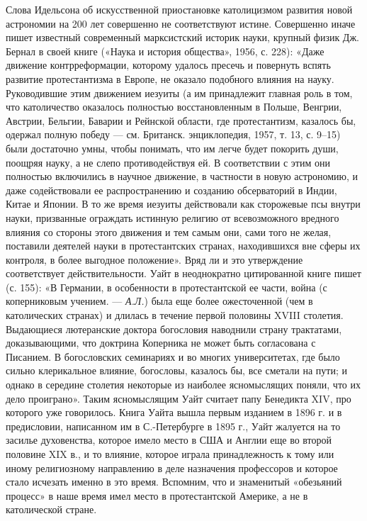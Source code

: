 Слова  Идельсона об  искусственной приостановке  католицизмом развития
новой  астрономии  на  200  лет совершенно  не  соответствуют  истине.
Совершенно  иначе  пишет  известный современный  марксистский  историк
науки,  крупный физик  Дж.  Бернал  в своей  книге  («Наука и  история
общества»,  1956, с.  228): «Даже  движение контрреформации,  которому
удалось пресечь  и повернуть вспять развитие  протестантизма в Европе,
не  оказало подобного  влияния на  науку. Руководившие  этим движением
иезуиты  (а  им  принадлежит  главная роль  в  том,  что  католичество
оказалось  полностью  восстановленным   в  Польше,  Венгрии,  Австрии,
Бельгии, Баварии  и Рейнской области, где  протестантизм, казалось бы,
одержал полную победу --- см.  Британск. энциклопедия, 1957, т. 13, с.
9--15)  были  достаточно умны,  чтобы  понимать,  что им  легче  будет
покорить  души,  поощряя  науку,  а не  слепо  противодействуя  ей.  В
соответствии с  этим они  полностью включились  в научное  движение, в
частности в новую астрономию,  и даже содействовали ее распространению
и  созданию обсерваторий  в  Индии,  Китае и  Японии.  В  то же  время
иезуиты  действовали  как  сторожевые  псы  внутри  науки,  призванные
ограждать  истинную  религию  от  всевозможного  вредного  влияния  со
стороны этого движения и тем самым  они, сами того не желая, поставили
деятелей  науки в  протестантских странах,  находившихся вне  сферы их
контроля,  в более  выгодное  положение». Вряд  ли  и это  утверждение
соответствует действительности. Уайт в неоднократно цитированной книге
пишет (с. 155): «В Германии,  в особенности в протестантской ее части,
война  (с  коперниковым  учением.  ---  \emph{А.Л.})  была  еще  более
ожесточенной (чем в  католических странах) и длилась  в течение первой
половины  XVIII столетия.  Выдающиеся  лютеранские доктора  богословия
наводнили  страну трактатами,  доказывающими,  что доктрина  Коперника
не  может  быть  согласована  с Писанием.  В  богословских  семинариях
и  во  многих университетах,  где  было  сильно клерикальное  влияние,
богословы,  казалось бы,  все сметали  на  пути; и  однако в  середине
столетия  некоторые  из  наиболее  ясномыслящих поняли,  что  их  дело
проиграно». Таким  ясномыслящим Уайт  считает папу Бенедикта  XIV, про
которого уже говорилось.  Книга Уайта вышла первым изданием  в 1896 г.
и  в  предисловии, написанном  им  в  С.-Петербурге  в 1895  г.,  Уайт
жалуется  на то  засилье  духовенства,  которое имело  место  в США  и
Англии еще  во второй половине  XIX в.,  и то влияние,  которое играла
принадлежность  к  тому  или  иному религиозному  направлению  в  деле
назначения профессоров  и которое стало  исчезать именно в  это время.
Вспомним, что и знаменитый «обезьяний процесс» в наше время имел место
в протестантской Америке, а не в католической стране.

